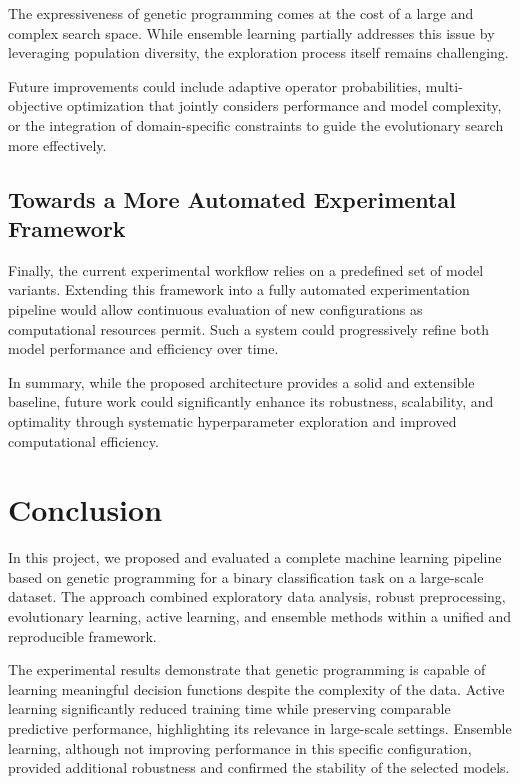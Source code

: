 \documentclass[12pt,a4paper]{article}
\begin{document}
The expressiveness of genetic programming comes at the cost of a large and complex search space. While ensemble learning partially addresses this issue by leveraging population diversity, the exploration process itself remains challenging.

Future improvements could include adaptive operator probabilities, multi-objective optimization that jointly considers performance and model complexity, or the integration of domain-specific constraints to guide the evolutionary search more effectively.

\medskip

\subsection{Towards a More Automated Experimental Framework}

Finally, the current experimental workflow relies on a predefined set of model variants. Extending this framework into a fully automated experimentation pipeline would allow continuous evaluation of new configurations as computational resources permit. Such a system could progressively refine both model performance and efficiency over time.

\medskip

In summary, while the proposed architecture provides a solid and extensible baseline, future work could significantly enhance its robustness, scalability, and optimality through systematic hyperparameter exploration and improved computational efficiency.

\section{Conclusion}

In this project, we proposed and evaluated a complete machine learning pipeline based on genetic programming for a binary classification task on a large-scale dataset. The approach combined exploratory data analysis, robust preprocessing, evolutionary learning, active learning, and ensemble methods within a unified and reproducible framework.

The experimental results demonstrate that genetic programming is capable of learning meaningful decision functions despite the complexity of the data. Active learning significantly reduced training time while preserving comparable predictive performance, highlighting its relevance in large-scale settings. Ensemble learning, although not improving performance in this specific configuration, provided additional robustness and confirmed the stability of the selected models.
\end{document}
